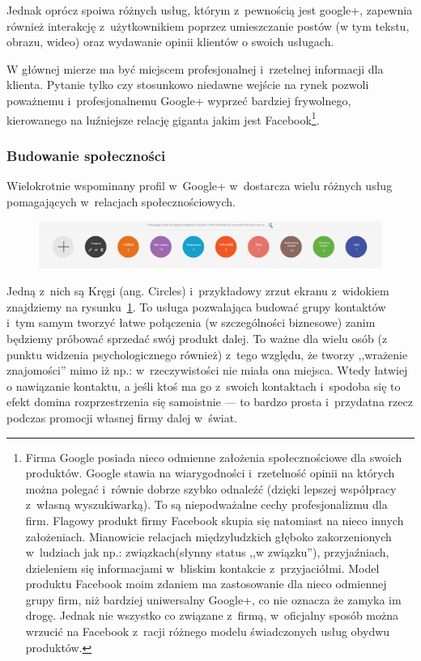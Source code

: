 \noindent Jednak oprócz spoiwa różnych usług, którym z~pewnością jest google+, zapewnia również interakcję z~użytkownikiem poprzez umieszczanie postów (w tym tekstu, obrazu, wideo) oraz wydawanie opinii klientów o swoich usługach. 

W głównej mierze ma być miejscem profesjonalnej i~rzetelnej informacji dla klienta. Pytanie tylko czy stosunkowo niedawne wejście na rynek pozwoli poważnemu i~profesjonalnemu Google+ wyprzeć bardziej frywolnego, kierowanego na luźniejsze relację giganta jakim jest Facebook\footnote{Firma Google posiada nieco odmienne założenia społecznościowe dla swoich produktów. Google stawia na wiarygodności i~rzetelność opinii na których można polegać i~równie dobrze szybko odnaleźć (dzięki lepszej współpracy z~własną wyszukiwarką). To są niepodważalne cechy profesjonalizmu dla firm. 
Flagowy produkt firmy Facebook skupia się natomiast na nieco innych założeniach. Mianowicie relacjach międzyludzkich głęboko zakorzenionych w~ludziach jak np.: związkach(słynny status ,,w związku''), przyjaźniach, dzieleniem się informacjami w~bliskim kontakcie z~przyjaciółmi. Model produktu Facebook moim zdaniem ma zastosowanie dla nieco odmiennej grupy firm, niż bardziej uniwersalny Google+, co nie oznacza że zamyka im drogę. Jednak nie wszystko co związane z~firmą, w~oficjalny sposób można wrzucić na Facebook z~racji różnego modelu świadczonych usług obydwu produktów.}.


\subsubsection{Budowanie społeczności}
Wielokrotnie wspominany profil w~Google+ w~dostarcza wielu różnych usług pomagających w~relacjach społecznościowych.

\begin{figure}[!h]
\centering
    \scalebox{0.25}
    {
        \includegraphics{images/google-plus-circles.png}
    }
    \label{fig:google-plus-circles}
\end{figure}

Jedną z~nich są Kręgi (ang. Circles) i~przykładowy zrzut ekranu z~widokiem znajdziemy na rysunku~\ref{fig:google-plus-circles}. To usługa pozwalająca budować grupy kontaktów i~tym samym tworzyć łatwe połączenia (w szczególności biznesowe) zanim będziemy próbować sprzedać swój produkt dalej. To ważne dla wielu osób (z punktu widzenia psychologicznego również) z~tego względu, że tworzy ,,wrażenie znajomości'' mimo iż np.: w~rzeczywistości nie miała ona miejsca.
Wtedy łatwiej o nawiązanie kontaktu, a jeśli ktoś ma go z~swoich kontaktach i~spodoba się to efekt domina rozprzestrzenia się samoistnie --- to bardzo prosta i~przydatna rzecz podczas promocji własnej firmy dalej w~świat.

